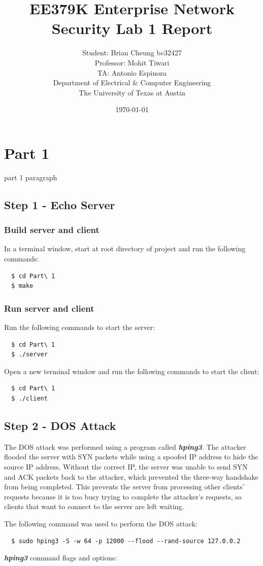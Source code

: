 \documentclass[11pt]{article}
\author{Student: Brian Cheung bc32427 \\ Professor: Mohit Tiwari \\ TA: Antonio Espinoza \\ Department of Electrical \& Computer Engineering \\ The University of Texas at Austin}
\date{\today}
\title{EE379K Enterprise Network Security Lab 1 Report}
\begin{document}
\maketitle
\section{Part 1}
\label{sec:part-1}
part 1 paragraph
\subsection{Step 1 - Echo Server}
\subsubsection{Build server and client}
In a terminal window, start at root directory of project and run the following commands:
\begin{verbatim}
  $ cd Part\ 1
  $ make
\end{verbatim}
\subsubsection{Run server and client}
Run the following commands to start the server:
\begin{verbatim}
  $ cd Part\ 1
  $ ./server
\end{verbatim}
Open a new terminal window and run the following commands to start the client:
\begin{verbatim}
  $ cd Part\ 1
  $ ./client
\end{verbatim}
\subsection{Step 2 - DOS Attack}
The DOS attack was performed using a program called \textbf{\emph{hping3}}.
The attacker flooded the server with SYN packets while using a spoofed IP address to hide the source IP address.
Without the correct IP, the server was unable to send SYN and ACK packets back to the attacker,
which prevented the three-way handshake from being completed.
This prevents the server from processing other clients' requests because it is too busy trying to complete the attacker's requests,
so clients that want to connect to the server are left waiting.

\noindent The following command was used to perform the DOS attack:
\begin{verbatim}
  $ sudo hping3 -S -w 64 -p 12000 --flood --rand-source 127.0.0.2
\end{verbatim}
\textbf{\emph{hping3}} command flags and options:
\end{document}
